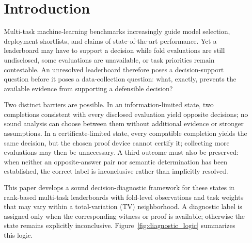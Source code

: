 \documentclass[preprint,11pt]{elsarticle}
\begin{document}
\section{Introduction}

Multi-task machine-learning benchmarks increasingly guide model selection, deployment shortlists, and claims of state-of-the-art performance. Yet a leaderboard may have to support a decision while fold evaluations are still undisclosed, some evaluations are unavailable, or task priorities remain contestable. An unresolved leaderboard therefore poses a decision-support question before it poses a data-collection question: what, exactly, prevents the available evidence from supporting a defensible decision?

Two distinct barriers are possible. In an information-limited state, two completions consistent with every disclosed evaluation yield opposite decisions; no sound analysis can choose between them without additional evidence or stronger assumptions. In a certificate-limited state, every compatible completion yields the same decision, but the chosen proof device cannot certify it; collecting more evaluations may then be unnecessary. A third outcome must also be preserved: when neither an opposite-answer pair nor semantic determination has been established, the correct label is inconclusive rather than implicitly resolved.

This paper develops a sound decision-diagnostic framework for these states in rank-based multi-task leaderboards with fold-level observations and task weights that may vary within a total-variation (TV) neighborhood. A diagnostic label is assigned only when the corresponding witness or proof is available; otherwise the state remains explicitly inconclusive. Figure~\ref{fig:diagnostic_logic} summarizes this logic.
\end{document}
